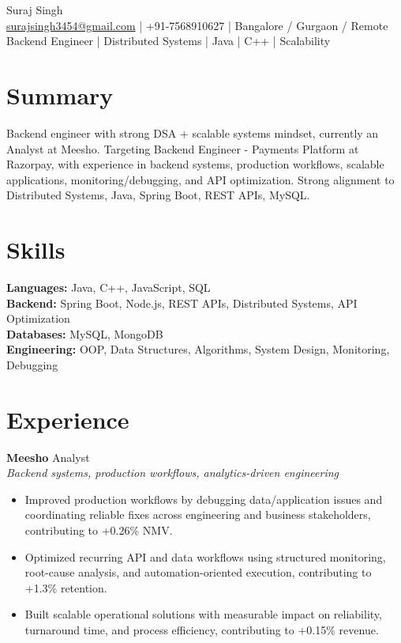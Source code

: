 \documentclass[10pt]{article}
\begin{document}
\begin{center}
{\Large Suraj Singh}\\
\href{mailto:surajsingh3454@gmail.com}{surajsingh3454@gmail.com} \quad | \quad +91-7568910627 \quad | \quad Bangalore / Gurgaon / Remote\\
Backend Engineer | Distributed Systems | Java | C++ | Scalability
\end{center}

\section*{Summary}
Backend engineer with strong DSA + scalable systems mindset, currently an Analyst at Meesho. Targeting Backend Engineer - Payments Platform at Razorpay, with experience in backend systems, production workflows, scalable applications, monitoring/debugging, and API optimization. Strong alignment to Distributed Systems, Java, Spring Boot, REST APIs, MySQL.

\section*{Skills}
\textbf{Languages:} Java, C++, JavaScript, SQL\\
\textbf{Backend:} Spring Boot, Node.js, REST APIs, Distributed Systems, API Optimization\\
\textbf{Databases:} MySQL, MongoDB\\
\textbf{Engineering:} OOP, Data Structures, Algorithms, System Design, Monitoring, Debugging

\section*{Experience}
\textbf{Meesho} \hfill Analyst\\
\textit{Backend systems, production workflows, analytics-driven engineering}\\
\begin{itemize}
\item Improved production workflows by debugging data/application issues and coordinating reliable fixes across engineering and business stakeholders, contributing to +0.26\% NMV.
\item Optimized recurring API and data workflows using structured monitoring, root-cause analysis, and automation-oriented execution, contributing to +1.3\% retention.
\item Built scalable operational solutions with measurable impact on reliability, turnaround time, and process efficiency, contributing to +0.15\% revenue.
\end{itemize}
\end{document}
